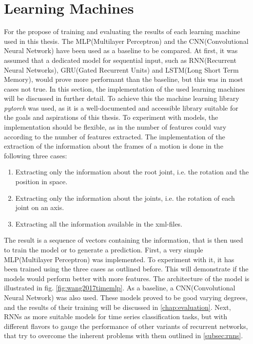 	\section{Learning Machines}
		\label{section:learningmachines}
		For the propose of training and evaluating the results of each learning machine used in this thesis. The MLP(Multilayer Perceptron) and the CNN(Convolutional Neural Network) have been used as a baseline to be compared. At first, it was assumed that a dedicated model for sequential input, such as RNN(Recurrent Neural Networks), GRU(Gated Recurrent Units) and LSTM(Long Short Term Memory), would prove more performant than the baseline, but this was in most cases not true. In this section, the implementation of the used learning machines will be discussed in further detail. To achieve this the machine learning library \textit{pytorch} was used, as it is a well-documented and accessible library suitable for the goals and aspirations of this thesis. To experiment with models, the implementation should be flexible, as in the number of features could vary according to the number of features extracted. The implementation of the extraction of the information about the frames of a motion is done in the following three cases:
		\begin{enumerate}
			\item Extracting only the information about the root joint, i.e. the rotation and the position in space.
			\item Extracting only the information about the joints, i.e. the rotation of each joint on an axis.
			\item Extracting all the information available in the xml-files.
		\end{enumerate}
		The result is a sequence of vectors containing the information, that is then used to train the model or to generate a prediction.\newline
		First, a very simple MLP(Multilayer Perceptron) was implemented. To experiment with it, it has been trained using the three cases as outlined before. This will demonstrate if the models would perform better with more features. The architecture of the model is illustrated in fig. \ref{fig:wang2017timemlp}. As a baseline, a CNN(Convolutional Neural Network) was also used. These models proved to be good varying degrees, and the results of their training will be discussed in \ref{chap:evaluation}. Next, RNNs as more suitable models for time series classification tasks, but with different flavors to gauge the performance of other variants of recurrent networks, that try to overcome the inherent problems with them outlined in \ref{subsec:rnns}.
